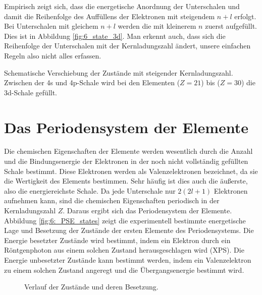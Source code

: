 Empirisch zeigt sich, dass die energetische Anordnung der Unterschalen und damit die Reihenfolge des Auffüllens der Elektronen mit steigendem $n+l$ erfolgt. Bei Unterschalen mit gleichem $n+l$ werden die mit kleinerem $n$ zuerst aufgefüllt. Dies ist in Abbildung  \ref{fig:6_state_3d}. Man erkennt auch, dass sich die Reihenfolge der Unterschalen mit der Kernladungszahl ändert, unsere einfachen Regeln also nicht alles erfassen.


\begin{marginfigure}
    \caption{Schematische Verschiebung der Zustände mit steigender Kernladungszahl. Zwischen der 4s und 4p-Schale wird bei den Elementen   ($Z=21$) bis  ($Z=30$) die 3d-Schale gefüllt.}
    \label{fig:6_state_3d}
\end{marginfigure}

\section{Das Periodensystem der Elemente}

Die chemischen Eigenschaften der Elemente werden wesentlich durch die Anzahl und die Bindungsenergie der Elektronen in der noch nicht vollständig gefüllten Schale bestimmt. Diese Elektronen werden als Valenzelektronen bezeichnet, da sie die Wertigkeit des Elements bestimmen. Sehr häufig ist dies auch die äußerste, also die energiereichste Schale. Da jede Unterschale nur $2 (2l +1)$ Elektronen aufnehmen kann, sind die chemischen Eigenschaften periodisch in der Kernladungszahl $Z$. Daraus ergibt sich das Periodensystem der Elemente. Abbildung \ref{fig:6:_PSE_states} zeigt die experimentell bestimmte energetische Lage und Besetzung der Zustände der ersten Elemente des Periodensystems. Die Energie besetzter Zustände wird bestimmt, indem ein Elektron durch ein Röntgenphoton aus einem solchen Zustand herausgeschlagen wird (XPS). Die Energie unbesetzter Zustände kann bestimmt werden, indem ein Valenzelektron zu einem solchen Zustand angeregt und die Übergangsenergie bestimmt wird.

\begin{figure}
    \caption{Verlauf der Zustände und deren Besetzung.}
    \label{fig:6_PSE_states}
\end{figure}

